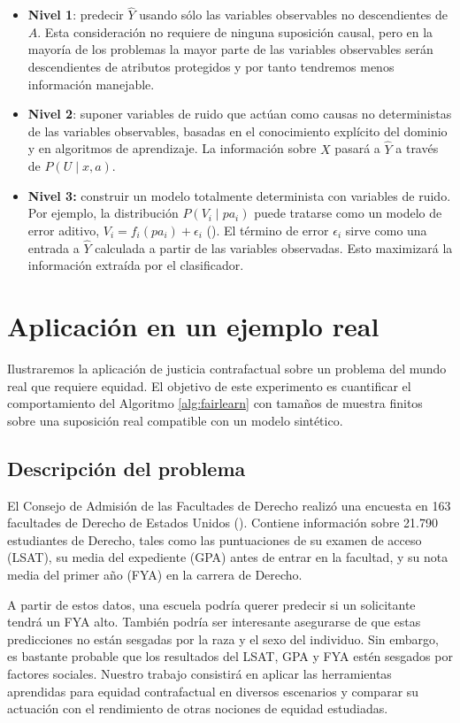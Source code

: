 \documentclass[oneside,openright,titlepage,numbers=noenddot,openany,headinclude,footinclude=true,
cleardoublepage=empty,abstractoff,BCOR=5mm,paper=a4,fontsize=12pt,main=spanish]{scrreprt}
\begin{document}
\begin{itemize}
    \item \textbf{Nivel 1}: predecir $\hat{Y}$ usando sólo las variables observables no descendientes de $A$. Esta consideración no requiere de ninguna suposición causal, pero en la mayoría de los problemas la mayor parte de las variables observables serán descendientes de atributos protegidos y por tanto tendremos menos información manejable.
    \item \textbf{Nivel 2}: suponer variables de ruido que actúan como causas no deterministas de las variables observables, basadas en el conocimiento explícito del dominio y en algoritmos de aprendizaje. La información sobre $X$ pasará a $\hat{Y}$ a través de $P(U \mid x, a)$.
    \item \textbf{Nivel 3:} construir un modelo totalmente determinista con variables de ruido. Por ejemplo, la distribución $P(V_i \mid pa_i)$ puede tratarse como un modelo de error aditivo, $V_i =f_i(pa_i)+\epsilon_i$ (\cite{noise2014}). El término de error $\epsilon_i$ sirve como una entrada a $\hat{Y}$ calculada a partir de las variables observadas. Esto maximizará la información extraída por el clasificador.
\end{itemize}

\section{Aplicación en un ejemplo real}

Ilustraremos la aplicación de justicia contrafactual sobre un problema del mundo real que requiere equidad. El objetivo de este experimento es cuantificar el comportamiento del Algoritmo \ref{alg:fairlearn} con tamaños de muestra finitos sobre una suposición real compatible con un modelo sintético.

\subsection{Descripción del problema}

El Consejo de Admisión de las Facultades de Derecho realizó una encuesta en 163 facultades de Derecho de Estados Unidos (\cite{lsac1998}). Contiene información sobre 21.790 estudiantes de Derecho, tales como las puntuaciones de su examen de acceso (LSAT), su media del expediente (GPA) antes de entrar en la facultad, y su nota media del primer año (FYA) en la carrera de Derecho.

A partir de estos datos, una escuela podría querer predecir si un solicitante tendrá un FYA alto. También podría ser interesante asegurarse de que estas predicciones no están sesgadas por la raza y el sexo del individuo. Sin embargo, es bastante probable que los resultados del LSAT, GPA y FYA estén sesgados por factores sociales. Nuestro trabajo consistirá en aplicar las herramientas aprendidas para equidad contrafactual en diversos escenarios y comparar su actuación con el rendimiento de otras nociones de equidad estudiadas.
\end{document}
